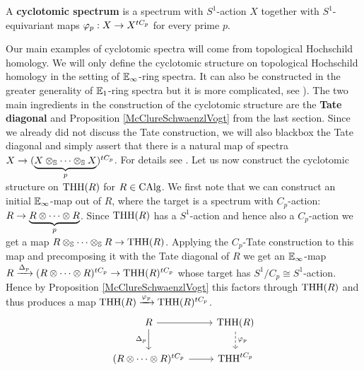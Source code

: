 \begin{defn}\cite[Chapter~2.1]{NS}
A \textbf{cyclotomic spectrum} is a spectrum with $S^1$-action $X$ together with  $S^1$-equivariant maps $\varphi_p: X \rightarrow X^{tC_p}$ for every prime $p$.
\end{defn}

Our main examples of cyclotomic spectra will 
come from topological Hochschild homology.
We will only define the cyclotomic structure on topological Hochschild homology in the setting of $\mathbb{E}_\infty$-ring spectra. It can also be constructed in the greater generality of $\mathbb{E}_1$-ring spectra but it is more complicated, see \cite[Chapter~3.1]{NS}).
The two main ingredients in the construction of the cyclotomic structure are the \textbf{Tate diagonal} and Proposition \ref{McClureSchwaenzlVogt} from the last section. Since we already did not discuss the Tate construction, we will also blackbox the Tate diagonal and simply assert that there is a natural map of spectra $X\rightarrow (\underbrace{X\otimes_{\mathbb{S}}\dots\otimes_{\mathbb{S}} X}_{p})^{tC_p}$.
For details see \cite[Section~3.1]{NS}.
Let us now construct the cyclotomic structure on $\operatorname{THH}(R)$ for $R\in \operatorname{CAlg}$. 
We first note that we can construct an initial $\mathbb{E}_\infty$-map out of $R$, where the target is a spectrum with $C_p$-action: $R\rightarrow \underbrace{R\otimes\dots\otimes R}_{p}$.
Since $\operatorname{THH}(R)$ has a $S^1$-action and hence also a $C_p$-action we get a map $R\otimes_{\mathbb{S}}\dots\otimes_{\mathbb{S}} R\rightarrow \operatorname{THH}(R)$. Applying the $C_p$-Tate construction to this map and precomposing it with the Tate diagonal of $R$ we get an $\mathbb{E}_\infty$-map $R\xrightarrow{\Delta_p} (R\otimes\dots\otimes R)^{tC_p}\rightarrow \operatorname{THH}(R)^{tC_p}$ whose target has $S^1/C_p\cong S^1$-action.
\\
Hence by Proposition \ref{McClureSchwaenzlVogt} this factors through $\operatorname{THH}(R)$ and thus produces a map $\operatorname{THH}(R)\xrightarrow{\varphi_p} \operatorname{THH}(R)^{tC_p}$.
\[\begin{tikzcd}
	{R} & {\text{THH}(R)} \\
	{(R\otimes\dots\otimes R)^{tC_p}} & {\text{THH}^{tC_p}}
	\arrow[from=1-1, to=1-2]
	\arrow["{\varphi_p}", from=1-2, to=2-2, dashed]
	\arrow["{\Delta_p}"', from=1-1, to=2-1]
	\arrow[from=2-1, to=2-2]
\end{tikzcd}\]
